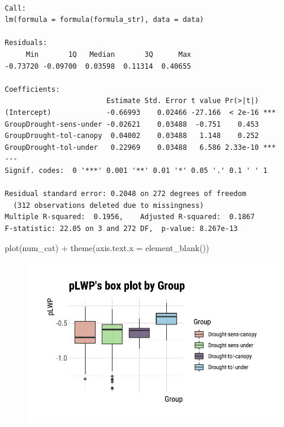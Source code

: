 \documentclass[
  letterpaper,
  DIV=11,
  numbers=noendperiod]{scrreprt}
\newenvironment{Shaded}{\begin{snugshade}}{\end{snugshade}}
\newcommand{\AttributeTok}[1]{\textcolor[rgb]{0.40,0.45,0.13}{#1}}
\newcommand{\FunctionTok}[1]{\textcolor[rgb]{0.28,0.35,0.67}{#1}}
\newcommand{\NormalTok}[1]{\textcolor[rgb]{0.00,0.23,0.31}{#1}}
\newcommand{\SpecialCharTok}[1]{\textcolor[rgb]{0.37,0.37,0.37}{#1}}
\begin{document}
\begin{verbatim}

Call:
lm(formula = formula(formula_str), data = data)

Residuals:
     Min       1Q   Median       3Q      Max 
-0.73720 -0.09700  0.03598  0.11314  0.40655 

Coefficients:
                        Estimate Std. Error t value Pr(>|t|)    
(Intercept)             -0.66993    0.02466 -27.166  < 2e-16 ***
GroupDrought-sens-under -0.02621    0.03488  -0.751    0.453    
GroupDrought-tol-canopy  0.04002    0.03488   1.148    0.252    
GroupDrought-tol-under   0.22969    0.03488   6.586 2.33e-10 ***
---
Signif. codes:  0 '***' 0.001 '**' 0.01 '*' 0.05 '.' 0.1 ' ' 1

Residual standard error: 0.2048 on 272 degrees of freedom
  (312 observations deleted due to missingness)
Multiple R-squared:  0.1956,    Adjusted R-squared:  0.1867 
F-statistic: 22.05 on 3 and 272 DF,  p-value: 8.267e-13
\end{verbatim}

\begin{Shaded}
\begin{Highlighting}[]
\FunctionTok{plot}\NormalTok{(num\_cat) }\SpecialCharTok{+} 
  \FunctionTok{theme}\NormalTok{(}\AttributeTok{axis.text.x =} \FunctionTok{element\_blank}\NormalTok{())}
\end{Highlighting}
\end{Shaded}

\begin{figure}[H]

{\centering \includegraphics{./CorrelateLikeDataMaster_files/figure-pdf/unnamed-chunk-10-1.pdf}

}

\end{figure}
\end{document}
